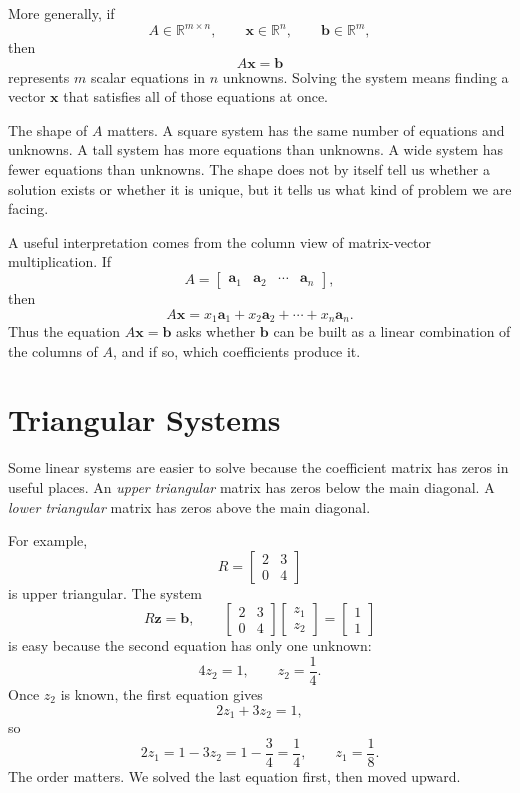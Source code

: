 More generally, if
\[
    A\in\mathbb{R}^{m\times n}, \qquad
    \mathbf{x}\in\mathbb{R}^n, \qquad
    \mathbf{b}\in\mathbb{R}^m,
\]
then
\[
    A\mathbf{x}=\mathbf{b}
\]
represents \(m\) scalar equations in \(n\) unknowns. Solving the system means finding a vector \(\mathbf{x}\) that satisfies all of those equations at once.

The shape of \(A\) matters. A square system has the same number of equations and unknowns. A tall system has more equations than unknowns. A wide system has fewer equations than unknowns. The shape does not by itself tell us whether a solution exists or whether it is unique, but it tells us what kind of problem we are facing.

A useful interpretation comes from the column view of matrix-vector multiplication. If
\[
    A=\begin{bmatrix}\mathbf{a}_1 & \mathbf{a}_2 & \cdots & \mathbf{a}_n\end{bmatrix},
\]
then
\[
    A\mathbf{x}=x_1\mathbf{a}_1+x_2\mathbf{a}_2+\cdots+x_n\mathbf{a}_n.
\]
Thus the equation \(A\mathbf{x}=\mathbf{b}\) asks whether \(\mathbf{b}\) can be built as a linear combination of the columns of \(A\), and if so, which coefficients produce it.

\section{Triangular Systems}
\label{mf:triangular-systems}

Some linear systems are easier to solve because the coefficient matrix has zeros in useful places. An \emph{upper triangular} matrix has zeros below the main diagonal. A \emph{lower triangular} matrix has zeros above the main diagonal.

For example,
\[
    R=\begin{bmatrix}
        2 & 3\\
        0 & 4
    \end{bmatrix}
\]
is upper triangular. The system
\[
    R\mathbf{z}=\mathbf{b}, \qquad
    \begin{bmatrix}
        2 & 3\\
        0 & 4
    \end{bmatrix}
    \begin{bmatrix}
        z_1\\z_2
    \end{bmatrix}
    =
    \begin{bmatrix}
        1\\1
    \end{bmatrix}
\]
is easy because the second equation has only one unknown:
\[
    4z_2=1,
    \qquad
    z_2=\frac14.
\]
Once \(z_2\) is known, the first equation gives
\[
    2z_1+3z_2=1,
\]
so
\[
    2z_1=1-3z_2=1-\frac34=\frac14,
    \qquad
    z_1=\frac18.
\]
The order matters. We solved the last equation first, then moved upward.

